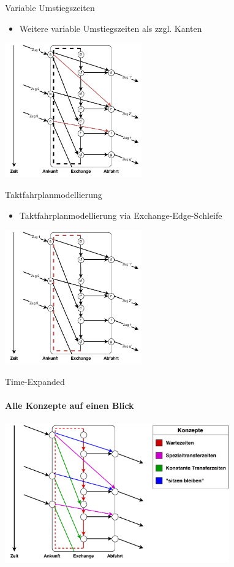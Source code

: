 \begin{frame}{Variable Umstiegszeiten}
	\begin{itemize}
		\item Weitere variable Umstiegszeiten als zzgl. Kanten
	\end{itemize}

	\begin{center}
		\includegraphics[height=5.8cm]{images/time_expanded_variable_interchange.pdf} 
	\end{center}
\end{frame}


\begin{frame}{Taktfahrplanmodellierung}
	\begin{itemize}
		\item Taktfahrplanmodellierung via Exchange-Edge-Schleife
	\end{itemize}

	\begin{center}
		\includegraphics[height=5.8cm]{images/time_expanded_constant_interchange_4.pdf} 
	\end{center}
\end{frame}


\begin{frame}{Time-Expanded}
	\framesubtitle{Alle Konzepte auf einen Blick}
	\begin{center}
		\includegraphics[height=6cm]{images/time-expanded/overview.pdf} 
	\end{center}
\end{frame}


